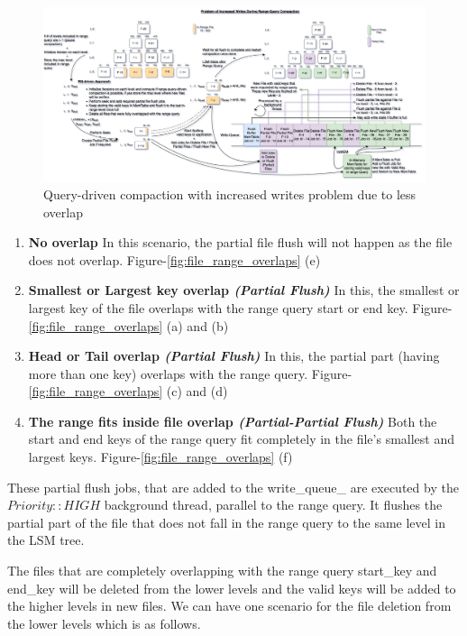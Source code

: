 \begin{figure}
    \includegraphics[scale=0.12]{Figures/RQ-driven problem of increased writes.png}
    \caption{Query-driven compaction with increased writes problem due to less overlap}\label{fig:query-driven_compaction_with_increased_writes}
\end{figure}

\begin{enumerate}
    \item \textbf{No overlap} In this scenario, the partial file flush will not happen as the file does not overlap. 
    Figure-\ref{fig:file_range_overlaps} (e)
    \item \textbf{Smallest or Largest key overlap \textit{(Partial Flush)}} In this, the smallest or largest key of the 
    file overlaps with the range query start or end key. Figure-\ref{fig:file_range_overlaps} (a) and (b)
    \item \textbf{Head or Tail overlap \textit{(Partial Flush)}} In this, the partial part (having more than one key) 
    overlaps with the range query. Figure-\ref{fig:file_range_overlaps} (c) and (d)
    \item \textbf{The range fits inside file overlap \textit{(Partial-Partial Flush)}} Both the start and end keys of 
    the range query fit completely in the file's smallest and largest keys. Figure-\ref{fig:file_range_overlaps} (f)
\end{enumerate}

These partial flush jobs, that are added to the write\_queue\_ are executed by the $Priority::HIGH$ background thread, 
parallel to the range query. It flushes the partial part of the file that does not fall in the range query to the same 
level in the LSM tree.

The files that are completely overlapping with the range query start\_key and end\_key will be deleted from the lower 
levels and the valid keys will be added to the higher levels in new files. We can have one scenario for the file 
deletion from the lower levels which is as follows.

